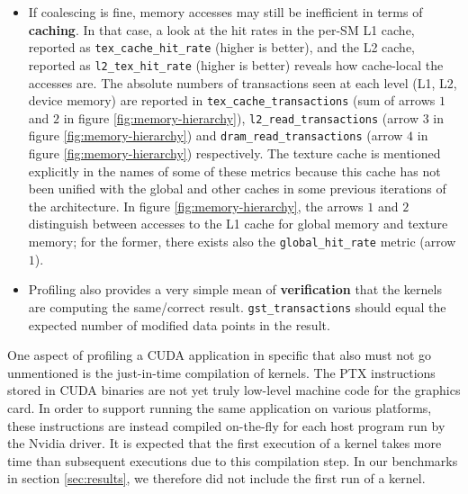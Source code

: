 \begin{itemize}
	\item If coalescing is fine, memory accesses may still be inefficient in terms of \textbf{caching}. In that case, a look at the hit rates in the per-SM L1 cache, reported as \texttt{tex\_cache\_hit\_rate} (higher is better), and the L2 cache, reported as \texttt{l2\_tex\_hit\_rate} (higher is better) reveals how cache-local the accesses are. The absolute numbers of transactions seen at each level (L1, L2, device memory) are reported in \texttt{tex\_cache\_transactions} (sum of arrows $1$ and $2$ in figure \ref{fig:memory-hierarchy}), \texttt{l2\_read\_transactions} (arrow $3$ in figure \ref{fig:memory-hierarchy}) and \texttt{dram\_read\_transactions} (arrow $4$ in figure \ref{fig:memory-hierarchy}) respectively. The texture cache is mentioned explicitly in the names of some of these metrics because this cache has not been unified with the global and other caches in some previous iterations of the architecture. In figure \ref{fig:memory-hierarchy}, the arrows $1$ and $2$ distinguish between accesses to the L1 cache for global memory and texture memory; for the former, there exists also the \texttt{global\_hit\_rate} metric (arrow $1$).
	\item Profiling also provides a very simple mean of \textbf{verification} that the kernels are computing the same/correct result. \texttt{gst\_transactions} should equal the expected number of modified data points in the result.
\end{itemize}

One aspect of profiling a CUDA application in specific that also must not go unmentioned is the just-in-time compilation of kernels. The PTX instructions stored in CUDA binaries are not yet truly low-level machine code for the graphics card. In order to support running the same application on various platforms, these instructions are instead compiled on-the-fly for each host program run by the Nvidia driver. It is expected that the first execution of a kernel takes more time than subsequent executions due to this compilation step. In our benchmarks in section \ref{sec:results}, we therefore did not include the first run of a kernel.